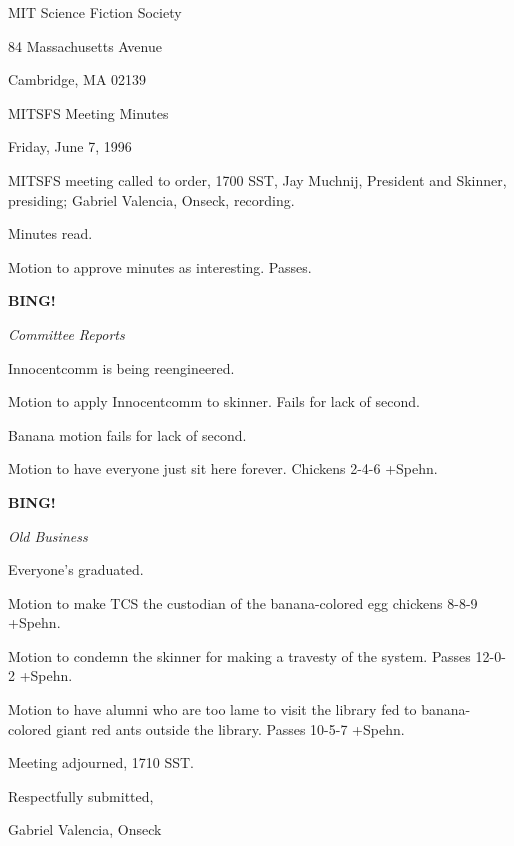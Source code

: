 \documentclass[12pt]{article}
\newcommand{\bing}{{\bf BING!} }
\newcommand{\goto}[1]{\bing \vskip 12pt \centerline{{\em{#1}}}}
\begin{document}
\begin{center}

MIT Science Fiction Society 

84 Massachusetts Avenue

Cambridge, MA 02139

\vspace{12pt}

MITSFS Meeting Minutes 

Friday, June 7, 1996

\end{center}
 
\vspace{18pt}

\setlength{\parskip}{6pt}

\noindent
MITSFS meeting called to order, 1700 SST,
Jay Muchnij, President and Skinner, presiding; Gabriel Valencia, Onseck, recording.

Minutes read.

Motion to approve minutes as interesting. Passes.

\goto{Committee Reports}

Innocentcomm is being reengineered.

Motion to apply Innocentcomm to skinner. Fails for lack of second. 

Banana motion fails for lack of second.

Motion to have everyone just sit here forever. Chickens 2-4-6 +Spehn.

\goto{Old Business}

Everyone's graduated.

Motion to make TCS the custodian of the banana-colored egg chickens 8-8-9 +Spehn.

Motion to condemn the skinner for making a travesty of the system. Passes 12-0-2 +Spehn.

Motion to have alumni who are too lame to visit the library fed to banana-colored giant red ants outside the library. Passes 10-5-7 +Spehn.

\vspace{12pt}

\noindent
Meeting adjourned, 1710 SST.

\vspace{18pt}

\centerline{Respectfully submitted,}
\centerline{Gabriel Valencia, Onseck}
\end{document}
